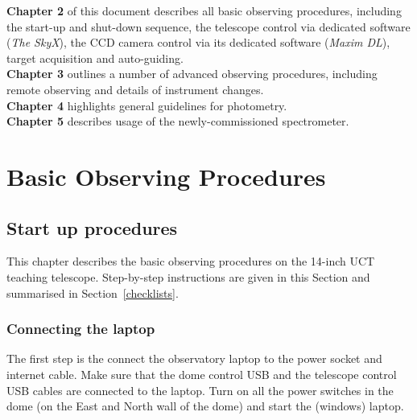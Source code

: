 \documentclass[12pt,twoside,a4paper]{report}
\begin{document}
\textbf{Chapter 2} of this document describes all basic observing procedures, including the start-up and shut-down sequence,
the telescope control via dedicated software (\emph{The SkyX}), the CCD camera control via its dedicated
software (\emph{Maxim DL}), target acquisition and auto-guiding.\\

\textbf{Chapter 3} outlines a number of advanced observing procedures, including remote observing and details of 
instrument changes.\\

\textbf{Chapter 4} highlights general guidelines for photometry.\\

\textbf{Chapter 5} describes usage of the newly-commissioned spectrometer.\\

\vfill \eject





\chapter{Basic Observing Procedures}

\section{Start up procedures}

This chapter describes the basic observing procedures on the 14-inch UCT teaching telescope. 
Step-by-step instructions are given in this Section and
summarised in Section~\ref{checklists}.

\subsection{Connecting the laptop}

The first step is the connect the observatory laptop to the power socket and internet cable. Make
sure that the dome control USB and the telescope control USB cables are connected to the laptop.
Turn on all the power switches in the dome (on the East and North wall of the dome) and start the
(windows) laptop.
\end{document}
